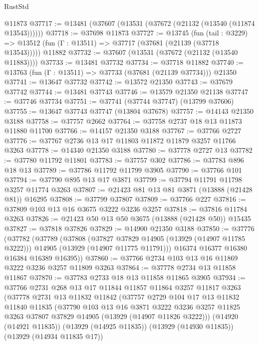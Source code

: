 \begin{lexlean}{RustStd}
\begin{coremodule}
    @11873
@37717 := @13481 (@37607 (@13531 (@37672 (@21132 (@13540 (@11874 @13543))))))
@37718 := @37698 @11873
@37727 := @13745
    (fun (tail : @3229) => @13512 (fun (Γ : @13511) => @37717 (@37681 (@21139 (@37718 @13543)))))
    @11882
@37732 := @37607 (@13531 (@37672 (@21132 (@13540 @11883))))
@37733 := @13481 @37732
@37734 := @37718 @11882
@37740 := @13763 (fun (Γ : @13511) => @37733 (@37681 (@21139 @37734))) @21350
@37741 := @13647 @37732
@37742 := @13572 @21350
@37743 := @37679 @37742
@37744 := @13481 @37743
@37746 := @13579 @21350 @21138
@37747 := @37746 @37734
@37751 := @37741 (@37744 @37747) (@13799 @37606)
@37755 := @13647 @37743 @37747 (@13804 @37678)
@37757 := @14143 @21350 @3188
@37758 := @37757 @2662
@37764 := @37758 @2737 @18 @13 @11873 @11880 @11700
@37766 := @14157 @21350 @3188
@37767 := @37766 @2727
@37776 := @37767 @2736 @13 @17 @11803 @11872 @11879 @3257 @11766 @3263
@37778 := @14340 @21350 @3188
@37780 := @37778 @2727 @13
@37782 := @37780 @11792 @11801
@37783 := @37757 @302
@37786 := @37783 @896 @18 @13
@37789 := @37786 @11792 @11799 @3905
@37790 := @37766 @101
@37794 := @37790 @895 @13 @17 @3871
@37799 := @37794 @11791 @11798 @3257 @11774 @3263
@37807 := @21423 @81 @13 @81 @3871 (@13888 (@21428 @81)) @16295
@37808 := @37799 @37807
@37809 := @37766 @227
@37816 := @37809 @103 @13 @16 @3675 @3222 @3236 @3257
@37818 := @37816 @11784 @3263
@37826 := @21423 @50 @13 @50 @3675 (@13888 (@21428 @50)) @15435
@37827 := @37818 @37826
@37829 := @14900 @21350 @3188
@37850 := @37776
    (@37782
      (@37789
        (@37808
          (@37827 @37829 @14905 (@13929 (@14907 @11785 @3222)))
          @14905
          (@13929 (@14907 @11775 @11791)))
        @16374
        @16377
        @16380
        @16384
        @16389
        @16395))
@37860 := @37766 @2734 @103 @13 @16 @11869 @3222 @3236 @3257 @11809 @3263
@37864 := @37778 @2734 @13 @11858 @11867
@37870 := @37783 @2733 @18 @13 @11858 @11865 @3905
@37934 := @37766
    @2731
    @268
    @13
    @17
    @11844
    @11857
    @11864
    @3257
    @11817
    @3263
    (@37778
      @2731
      @13
      @11832
      @11842
      (@37757
        @2729
        @104
        @17
        @13
        @11832
        @11840
        @11835
        (@37790
          @103
          @13
          @16
          @3871
          @3222
          @3236
          @3257
          @11825
          @3263
          @37807
          @37829
          @14905
          (@13929 (@14907 @11826 @3222)))
        (@14920 (@14921 @11835))
        (@13929 (@14925 @11835))
        (@13929 (@14930 @11835))
        (@13929 (@14934 @11835 @17))

\end{coremodule}
\end{lexlean}
